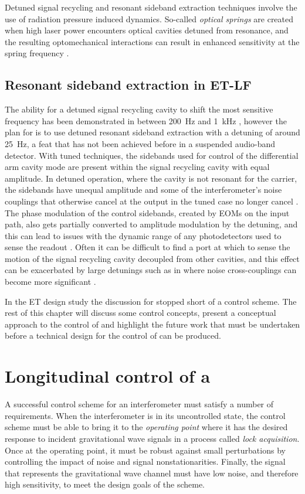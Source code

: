 Detuned signal recycling and resonant sideband extraction techniques involve the use of radiation pressure induced dynamics. So-called \emph{optical springs} are created when high laser power encounters optical cavities detuned from resonance, and the resulting optomechanical interactions can result in enhanced sensitivity at the spring frequency \cite{Buonanno2002}.

\subsection{Resonant sideband extraction in ET-LF}
The ability for a detuned signal recycling cavity to shift the most sensitive frequency has been demonstrated in \GEO{} between \SI{200}{\hertz} and \SI{1}{\kilo\hertz} \cite{Hild2006}, however the plan for \ETLF{} is to use detuned resonant sideband extraction with a detuning of around \SI{25}{\hertz}, a feat that has not been achieved before in a suspended audio-band detector. With tuned techniques, the sidebands used for control of the differential arm cavity mode are present within the signal recycling cavity with equal amplitude. In detuned operation, where the cavity is not resonant for the carrier, the sidebands have unequal amplitude and some of the interferometer's noise couplings that otherwise cancel at the output in the tuned case no longer cancel \cite{Hild2007}. The phase modulation of the control sidebands, created by \glspl{EOM} on the input path, also gets partially converted to amplitude modulation by the detuning, and this can lead to issues with the dynamic range of any photodetectors used to sense the readout \cite{Grote2007}. Often it can be difficult to find a port at which to sense the motion of the signal recycling cavity decoupled from other cavities, and this effect can be exacerbated by large detunings such as in \ETLF{} where noise cross-couplings can become more significant \cite{Hild2007}.

In the \gls{ET} design study the discussion for \ETLF{} stopped short of a control scheme. The rest of this chapter will discuss some control concepts, present a conceptual approach to the control of \ETLF{} and highlight the future work that must be undertaken before a technical design for the control of \ETLF{} can be produced.

\section{\label{sec:multi-dof-control}Longitudinal control of a \DRFPMI{}}
A successful control scheme for an interferometer must satisfy a number of requirements. When the interferometer is in its uncontrolled state, the control scheme must be able to bring it to the \emph{operating point} where it has the desired response to incident gravitational wave signals in a process called \emph{lock acquisition}. Once at the operating point, it must be robust against small perturbations by controlling the impact of noise and signal nonstationarities. Finally, the signal that represents the gravitational wave channel must have low noise, and therefore high sensitivity, to meet the design goals of the scheme.

